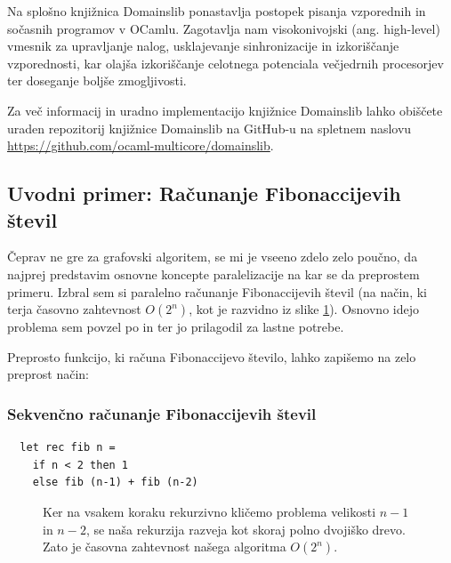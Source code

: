 \documentclass[mat1, tisk]{fmfdelo}
\begin{document}
Na splošno knjižnica Domainslib ponastavlja postopek pisanja vzporednih in sočasnih programov v OCamlu. 
Zagotavlja nam visokonivojski (ang. high-level) vmesnik za upravljanje nalog, usklajevanje sinhronizacije in
izkoriščanje vzporednosti, kar olajša izkoriščanje celotnega potenciala večjedrnih procesorjev ter doseganje boljše
zmogljivosti.

Za več informacij in uradno implementacijo knjižnice Domainslib lahko obiščete uraden repozitorij
knjižnice Domainslib na GitHub-u na spletnem naslovu \url{https://github.com/ocaml-multicore/domainslib}.


\subsection{Uvodni primer: Računanje Fibonaccijevih števil}

Čeprav ne gre za grafovski algoritem, se mi je vseeno zdelo zelo poučno, da najprej predstavim osnovne koncepte
paralelizacije na kar se da preprostem primeru. Izbral sem si paralelno računanje Fibonaccijevih števil
(na način, ki terja časovno zahtevnost $O(2^n)$, kot je razvidno iz slike \ref{fig:fib-graph}).
Osnovno idejo problema sem povzel po \cite{parallel_fib_computation} in \cite{multicore_ocaml_article} ter jo prilagodil
za lastne potrebe.

Preprosto funkcijo, ki računa Fibonaccijevo število, lahko zapišemo na zelo preprost način:

\subsubsection{Sekvenčno računanje Fibonaccijevih števil}

\begin{lstlisting}
  let rec fib n =
    if n < 2 then 1
    else fib (n-1) + fib (n-2)
\end{lstlisting}

\begin{figure}[htb]
  \centering
  \caption{Ker na vsakem koraku rekurzivno kličemo problema velikosti $n-1$ in $n-2$, se naša rekurzija razveja
  kot skoraj polno dvojiško drevo. Zato je časovna zahtevnost našega algoritma $O(2^n)$.}
  \label{fig:fib-graph}
\end{figure}
\end{document}
